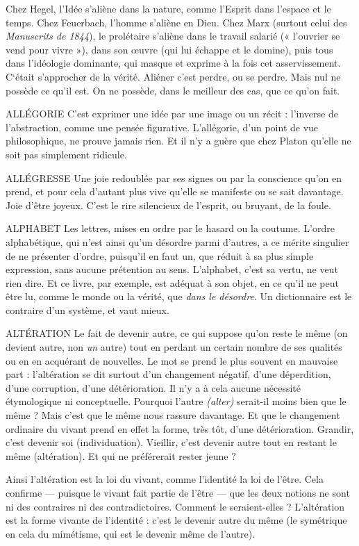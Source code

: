 Chez Hegel, l’Idée s’aliène dans la nature, comme l'Esprit dans l’espace et
le temps. Chez Feuerbach, l’homme s’aliène en Dieu. Chez Marx (surtout celui
des {\it Manuscrits de 1844}), le prolétaire s’aliène dans le travail salarié (« l’ouvrier
se vend pour vivre »), dans son œuvre (qui lui échappe et le domine), puis tous
dans l’idéologie dominante, qui masque et exprime à la fois cet asservissement.
C‘était s'approcher de la vérité. Aliéner c’est perdre, ou se perdre. Mais nul ne
possède ce qu’il est. On ne possède, dans le meilleur des cas, que ce qu’on fait.

ALLÉGORIE C'est exprimer une idée par une image ou un récit : l’inverse de
l’abstraction, comme une pensée figurative. L’allégorie, d’un
point de vue philosophique, ne prouve jamais rien. Et il n’y a guère que chez
Platon qu’elle ne soit pas simplement ridicule.

ALLÉGRESSE Une joie redoublée par ses signes ou par la conscience qu’on
en prend, et pour cela d’autant plus vive qu’elle se manifeste
ou se sait davantage. Joie d’être joyeux. C’est le rire silencieux de l'esprit, ou
bruyant, de la foule.

ALPHABET Les lettres, mises en ordre par le hasard ou la coutume. L’ordre
alphabétique, qui n’est ainsi qu’un désordre parmi d’autres, a ce
mérite singulier de ne présenter d'ordre, puisqu'il en faut un, que réduit à sa
plus simple expression, sans aucune prétention au sens. L’alphabet, c’est sa
vertu, ne veut rien dire. Et ce livre, par exemple, est adéquat à son objet, en ce
qu’il ne peut être lu, comme le monde ou la vérité, que {\it dans le désordre}. Un dictionnaire
est le contraire d’un système, et vaut mieux.

ALTÉRATION Le fait de devenir autre, ce qui suppose qu’on reste le même
(on devient autre, non {\it un} autre) tout en perdant un certain
nombre de ses qualités ou en en acquérant de nouvelles. Le mot se prend le
plus souvent en mauvaise part : l’altération se dit surtout d’un changement
négatif, d’une déperdition, d’une corruption, d’une détérioration. Il n’y a à
cela aucune nécessité étymologique ni conceptuelle. Pourquoi l’autre {\it (alter)}
serait-il moins bien que le même ? Mais c’est que le même nous rassure davantage.
Et que le changement ordinaire du vivant prend en effet la forme, très tôt,
d’une détérioration. Grandir, c’est devenir soi (individuation). Vieillir, c’est
devenir autre tout en restant le même (altération). Et qui ne préférerait rester
jeune ?

Ainsi l’altération est la loi du vivant, comme l'identité la loi de l’être. Cela
confirme — puisque le vivant fait partie de l'être — que les deux notions ne sont
ni des contraires ni des contradictoires. Comment le seraient-elles ? L’altération
est la forme vivante de l’identité : c’est le devenir autre du même (le symétrique
en cela du mimétisme, qui est le devenir même de l’autre).

